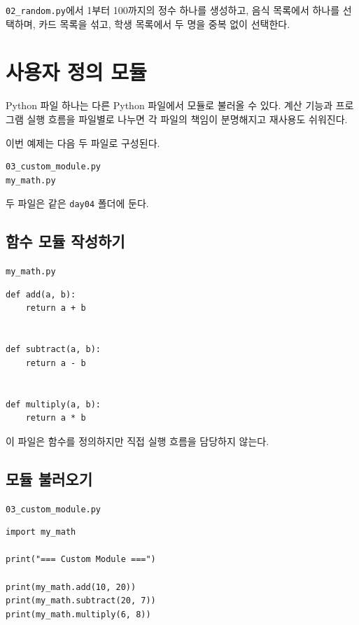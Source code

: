 \documentclass[11pt,a4paper]{article}
\begin{document}
\begin{practicebox}
\texttt{02\_random.py}에서 1부터 100까지의 정수 하나를 생성하고, 음식 목록에서 하나를 선택하며, 카드 목록을 섞고, 학생 목록에서 두 명을 중복 없이 선택한다.
\end{practicebox}

\section{사용자 정의 모듈}

Python 파일 하나는 다른 Python 파일에서 모듈로 불러올 수 있다. 계산 기능과 프로그램 실행 흐름을 파일별로 나누면 각 파일의 책임이 분명해지고 재사용도 쉬워진다.

이번 예제는 다음 두 파일로 구성된다.

\begin{verbatim}
03_custom_module.py
my_math.py
\end{verbatim}

두 파일은 같은 \texttt{day04} 폴더에 둔다.

\subsection{함수 모듈 작성하기}

\texttt{my\_math.py}

\begin{lstlisting}
def add(a, b):
    return a + b


def subtract(a, b):
    return a - b


def multiply(a, b):
    return a * b
\end{lstlisting}

이 파일은 함수를 정의하지만 직접 실행 흐름을 담당하지 않는다.

\subsection{모듈 불러오기}

\texttt{03\_custom\_module.py}

\begin{lstlisting}
import my_math

print("=== Custom Module ===")

print(my_math.add(10, 20))
print(my_math.subtract(20, 7))
print(my_math.multiply(6, 8))
\end{lstlisting}
\end{document}
